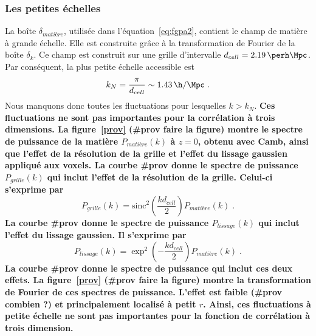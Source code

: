 \documentclass[11pt, twoside, a4paper, openright]{report}
\begin{document}
\subsubsection{Les petites échelles}
La boîte $\delta_{matière}$, utilisée dans l'équation~\ref{eq:fgpa2}, contient le champ de matière à grande échelle. Elle est construite grâce à la transformation de Fourier de la boîte $\delta_k$.
Ce champ est construit sur une grille d'intervalle $d_{cell} = \SI{2.19}{\perh\Mpc}$. Par conséquent, la plus petite échelle accessible est
\begin{equation}
  k_N = \frac{\pi}{d_{cell}} \sim \SI{1.43}{\h\per\Mpc} \; .
\end{equation}
Nous manquons donc toutes les fluctuations pour lesquelles $k > k_N$.
\textbf{
  Ces fluctuations ne sont pas importantes pour la corrélation à trois dimensions. La figure~\ref{prov} (\#prov faire la figure) montre le spectre de puissance de la matière $P_{matière}(k)$ à $z=0$, obtenu avec Camb, ainsi que l'effet de la résolution de la grille et l'effet du lissage gaussien appliqué aux voxels. La courbe \#prov donne le spectre de puissance $P_{grille}(k)$ qui inclut l'effet de la résolution de la grille. Celui-ci s'exprime par
  \begin{equation}
    P_{grille}(k) =  \mathrm{sinc}^2(\frac{k d_{cell}}{2}) P_{matière}(k) \; .
  \end{equation}
  La courbe \#prov donne le spectre de puissance $P_{lissage}(k)$ qui inclut l'effet du lissage gaussien. Il s'exprime par
  \begin{equation}
    P_{lissage}(k) =  \exp^2(- \frac{k d_{cell}}{2}) P_{matière}(k) \; .
  \end{equation}
  La courbe \#prov donne le spectre de puissance qui inclut ces deux effets.
  La figure~\ref{prov} (\#prov faire la figure) montre la transformation de Fourier de ces spectres de puissance. L'effet est faible (\#prov combien ?) et principalement localisé à petit $r$.
  Ainsi, ces fluctuations à petite échelle ne sont pas importantes pour la fonction de corrélation à trois dimension.
}
\end{document}
